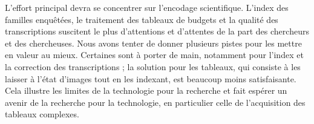 L'effort principal devra se concentrer sur l'encodage scientifique. L'index des familles enquêtées, le traitement des tableaux de budgets et la qualité des transcriptions suscitent le plus d'attentions et d'attentes de la part des chercheurs et des chercheuses. Nous avons tenter de donner plusieurs pistes pour les mettre en valeur au mieux. Certaines sont à porter de main, notamment pour l'index et la correction des transcriptions ; la solution pour les tableaux, qui consiste à les laisser à l'état d'images tout en les indexant, est beaucoup moins satisfaisante. Cela illustre les limites de la technologie pour la recherche et fait espérer un avenir de la recherche pour la technologie, en particulier celle de l'acquisition des tableaux complexes.